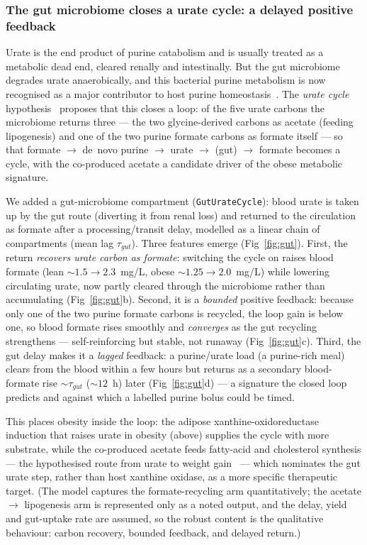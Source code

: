 \documentclass[10pt,letterpaper]{article}
\begin{document}
\subsubsection*{The gut microbiome closes a urate cycle: a delayed positive
feedback}
Urate is the end product of purine catabolism and is usually treated as a
metabolic dead end, cleared renally and intestinally. But the gut microbiome
degrades urate anaerobically, and this bacterial purine metabolism is now
recognised as a major contributor to host purine homeostasis~\cite{kasahara2023}. The \emph{urate cycle} hypothesis~\cite{vazquez2020urate} proposes
that this closes a loop: of the five urate carbons the microbiome returns three
--- the two glycine-derived carbons as acetate (feeding lipogenesis) and one of
the two purine formate carbons as formate itself --- so that
formate $\rightarrow$ de~novo purine $\rightarrow$ urate $\rightarrow$ (gut)
$\rightarrow$ formate becomes a cycle, with the co-produced acetate a candidate
driver of the obese metabolic signature.

We added a gut-microbiome compartment (\texttt{GutUrateCycle}): blood urate is
taken up by the gut route (diverting it from renal loss) and returned to the
circulation as formate after a processing/transit delay, modelled as a linear
chain of compartments (mean lag $\tau_{gut}$). Three features emerge
(Fig~\ref{fig:gut}). First, the return \emph{recovers urate carbon as formate}:
switching the cycle on raises blood formate (lean ${\sim}1.5\rightarrow2.3$~mg/L,
obese ${\sim}1.25\rightarrow2.0$~mg/L) while lowering circulating urate, now partly
cleared through the microbiome rather than accumulating (Fig~\ref{fig:gut}b).
Second, it is a \emph{bounded} positive feedback: because only one of the two
purine formate carbons is recycled, the loop gain is below one, so blood formate
rises smoothly and \emph{converges} as the gut recycling strengthens ---
self-reinforcing but stable, not runaway (Fig~\ref{fig:gut}c). Third, the gut
delay makes it a \emph{lagged} feedback: a purine/urate load (a purine-rich meal)
clears from the blood within a few hours but returns as a secondary blood-formate
rise ${\sim}\tau_{gut}$ (${\sim}12$~h) later (Fig~\ref{fig:gut}d) --- a signature
the closed loop predicts and against which a labelled purine bolus could be timed.

This places obesity inside the loop: the adipose xanthine-oxidoreductase induction
that raises urate in obesity (above) supplies the cycle with more substrate, while
the co-produced acetate feeds fatty-acid and cholesterol synthesis --- the
hypothesised route from urate to weight gain~\cite{vazquez2020urate} --- which nominates
the gut urate step, rather than host xanthine oxidase, as a more specific
therapeutic target. (The model captures the formate-recycling arm quantitatively;
the acetate $\rightarrow$ lipogenesis arm is represented only as a noted output, and
the delay, yield and gut-uptake rate are assumed, so the robust content is the
qualitative behaviour: carbon recovery, bounded feedback, and delayed return.)
\end{document}
